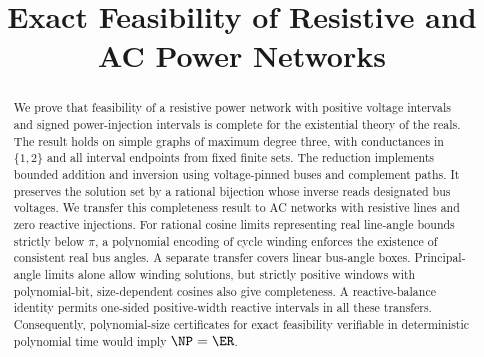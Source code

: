 \documentclass[11pt]{article}
\title{Exact Feasibility of Resistive and AC Power Networks}
\author{}
\date{}
\begin{document}
\maketitle
\begin{abstract}
We prove that feasibility of a resistive power network with positive voltage
intervals and signed power-injection intervals is complete for the existential
theory of the reals. The result holds on simple graphs of maximum degree three,
with conductances in $\{1,2\}$ and all interval endpoints from fixed finite sets.
The reduction implements bounded addition and inversion using voltage-pinned
buses and complement paths. It preserves the solution set by a rational
bijection whose inverse reads designated bus voltages. We transfer this
completeness result to AC networks with resistive lines and zero reactive
injections. For rational cosine limits representing real line-angle bounds
strictly below $\pi$, a polynomial encoding of cycle winding enforces the
existence of consistent real bus angles. A separate transfer covers linear
bus-angle boxes. Principal-angle limits alone allow winding solutions, but
strictly positive windows with polynomial-bit, size-dependent cosines also
give completeness. A reactive-balance identity permits one-sided
positive-width reactive intervals in all these transfers. Consequently,
polynomial-size certificates for exact
feasibility verifiable in deterministic polynomial time would imply
$\NP=\ER$.
\end{abstract}





\end{document}
